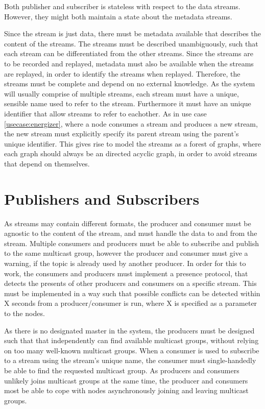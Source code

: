 Both publisher and subscriber is stateless with respect to the data streams. However, they might both maintain a state about the metadata streams.

Since the stream is just data, there must be metadata available that describes the content of the streams. The streams must be described unambiguously, such that each stream can be differentiated from the other streams. Since the streams are to be recorded and replayed, metadata must also be available when the streams are replayed, in order to identify the streams when replayed. Therefore, the streams must be complete and depend on no external knowledge.
As the system will usually comprise of multiple streams, each stream must have a unique, sensible name used to refer to the stream. Furthermore it must have an unique identifier that allow streams to refer to eachother.
As in use case \ref{usecase:energizer}, where a node consumes a stream and produces a new stream, the new stream must explicitly specify its parent stream using the parent's unique identifier. This gives rise to model the streams as a forest of graphs, where each graph should always be an directed acyclic graph, in order to avoid streams that depend on themselves.


\section{Publishers and Subscribers}
As streams may contain different formats, the producer and consumer must be agnostic to the content of the stream, and must handle the data to and from the stream.
Multiple consumers and producers must be able to subscribe and publish to the same multicast group, however the producer and consumer must give a warning, if the topic is already used by another producer. In order for this to work, the consumers and producers must implement a presence protocol, that detects the presents of other producers and consumers on a specific stream. This must be implemented in a way such that possible conflicts can be detected within X seconds from a producer/consumer is run, where X is specified as a parameter to the nodes.

As there is no designated master in the system, the producers must be designed such that that independently can find available multicast groups, without relying on too many well-known multicast groups. When a consumer is used to subscribe to a stream using the stream's unique name, the consumer must single-handedly be able to find the requested multicast group.
As producers and consumers unlikely joins multicast groups at the same time, the producer and consumers most be able to cope with nodes asynchronously joining and leaving multicast groups.

